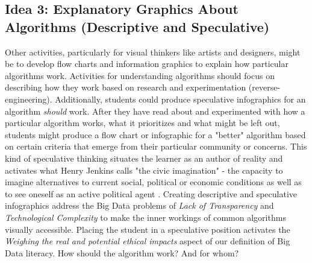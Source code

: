 \documentclass{sig-alternate}
\begin{document}
\subsection{Idea 3: Explanatory Graphics About\\Algorithms (Descriptive and Speculative)}
Other activities, particularly for visual thinkers like artists and designers, might be to develop flow charts and information graphics to explain how particular algorithms work. Activities for understanding algorithms should focus on describing how they work based on research and experimentation (reverse-engineering). Additionally, students could produce speculative infographics for an algorithm \textit{should} work. After they have read about and experimented with how a particular algorithm works, what it prioritizes and what might be left out, students might produce a flow chart or infographic for a "better" algorithm based on certain criteria that emerge from their particular community or concerns. This kind of speculative thinking situates the learner as an author of reality and activates what Henry Jenkins calls "the civic imagination" - the capacity to imagine alternatives to current social, political or economic conditions as well as to see oneself as an active political agent \cite{jenkins_2016}. Creating descriptive and speculative infographics address the Big Data problems of \textit{Lack of Transparency} and \textit{Technological Complexity} to make the inner workings of common algorithms visually accessible. Placing the student in a speculative position activates the \textit{Weighing the real and potential ethical impacts} aspect of our definition of Big Data literacy. How should the algorithm work? And for whom?
\end{document}
